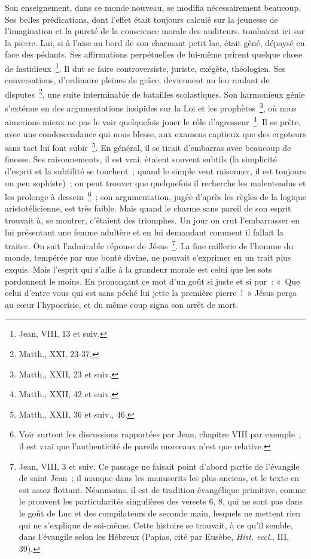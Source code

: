 \documentclass[french,twoside]{book} %
\begin{document}
Son enseignement, dans ce monde nouveau, se modifia nécessairement beaucoup. Ses belles prédications, dont l’effet était toujours calculé sur la jeunesse de l’imagination et la pureté de la conscience morale des auditeurs, tombaient ici sur la pierre. Lui, si à l’aise au bord de son charmant petit lac, était gêné, dépaysé en face des pédants. Ses affirmations perpétuelles de lui-même prirent quelque chose de fastidieux \footnote{Jean, VIII, 13 et suiv.}. Il dut se faire controversiste, juriste, exégète, théologien. Ses conversations, d’ordinaire pleines de grâce, deviennent un feu roulant de disputes \footnote{Matth., XXI, 23-37.}, une suite interminable de batailles scolastiques. Son harmonieux génie s’exténue en des argumentations insipides sur la Loi et les prophètes \footnote{Matth., XXII, 23 et suiv.}, où nous aimerions mieux ne pas le voir quelquefois jouer le rôle d’agresseur \footnote{Matth., XXII, 42 et suiv.}. Il se prête, avec une condescendance qui nous blesse, aux examens captieux que des ergoteurs sans tact lui font subir \footnote{Matth., XXII, 36 et suiv., 46.}. En général, il se tirait d’embarras avec beaucoup de finesse. Ses raisonnements, il est vrai, étaient souvent subtils (la simplicité d’esprit et la subtilité se touchent ; quand le simple veut raisonner, il est toujours un peu sophiste) ; on peut trouver que quelquefois il recherche les malentendus et les prolonge à dessein \footnote{Voir surtout les discussions rapportées par Jean, chapitre VIII par exemple ; il est vrai que l’authenticité de pareils morceaux n’est que relative.} ; son argumentation, jugée d’après les règles de la logique aristotélicienne, est très faible. Mais quand le charme sans pareil de son esprit trouvait à, se montrer, c’étaient des triomphes. Un jour on crut l’embarrasser en lui présentant une femme adultère et en lui demandant comment il fallait la traiter. On sait l’admirable réponse de Jésus \footnote{ Jean, VIII, 3 et suiv. Ce passage ne faisait point d’abord partie de l’évangile de saint Jean ; il manque dans les manuscrits les plus anciens, et le texte en est assez flottant. Néanmoins, il est de tradition évangélique primitive, comme le prouvent les particularités singulières des versets 6, 8, qui ne sont pas dans le goût de Luc et des compilateurs de seconde main, lesquels ne mettent rien qui ne s’explique de soi-même. Cette histoire se trouvait, à ce qu’il semble, dans l’évangile selon les Hébreux (Papias, cité par Eusèbe, {\itshape Hist. eccl.}, III, 39).}. La fine raillerie de l’homme du monde, tempérée par une bonté divine, ne pouvait s’exprimer en un trait plus exquis. Mais l’esprit qui s’allie à la grandeur morale est celui que les sots pardonnent le moins. En prononçant ce mot d’un goût si juste et si pur : « Que celui d’entre vous qui est sans péché lui jette la première pierre ! » Jésus perça au cœur l’hypocrisie, et du même coup signa son arrêt de mort.\par
\end{document}
